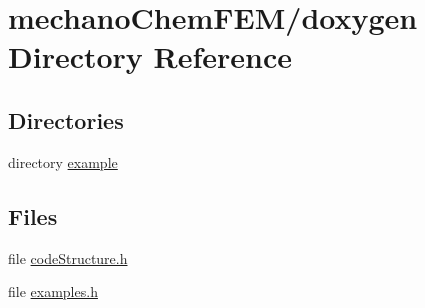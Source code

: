 \section{mechano\-Chem\-F\-E\-M/doxygen Directory Reference}
\label{dir_cca7feb76ec5d76eaf2b106df0f5fff6}
\subsection*{Directories}
\begin{DoxyCompactItemize}
\item 
directory \hyperlink{dir_f479854301208d69f1596e8aab2cb7d5}{example}
\end{DoxyCompactItemize}
\subsection*{Files}
\begin{DoxyCompactItemize}
\item 
file \hyperlink{code_structure_8h}{code\-Structure.\-h}
\item 
file \hyperlink{examples_8h}{examples.\-h}
\end{DoxyCompactItemize}
